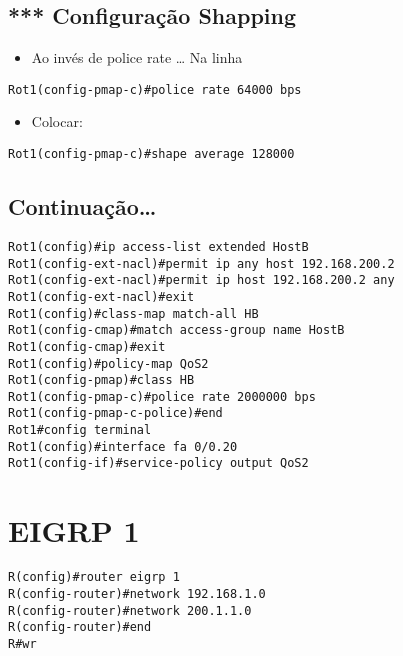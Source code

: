 \documentclass[]{article}
\begin{document}
\subsection{*** Configuração
Shapping}\label{configurauxe7uxe3o-shapping}

\begin{itemize}
\itemsep1pt\parskip0pt
\item
  Ao invés de police rate \ldots{} Na linha
\end{itemize}

\begin{verbatim}
Rot1(config-pmap-c)#police rate 64000 bps
\end{verbatim}

\begin{itemize}
\itemsep1pt\parskip0pt
\item
  Colocar:
\end{itemize}

\begin{verbatim}
Rot1(config-pmap-c)#shape average 128000
\end{verbatim}

\subsection{Continuação\ldots{}}\label{continuauxe7uxe3o}

\begin{verbatim}
Rot1(config)#ip access-list extended HostB
Rot1(config-ext-nacl)#permit ip any host 192.168.200.2
Rot1(config-ext-nacl)#permit ip host 192.168.200.2 any
Rot1(config-ext-nacl)#exit
Rot1(config)#class-map match-all HB
Rot1(config-cmap)#match access-group name HostB
Rot1(config-cmap)#exit
Rot1(config)#policy-map QoS2
Rot1(config-pmap)#class HB
Rot1(config-pmap-c)#police rate 2000000 bps
Rot1(config-pmap-c-police)#end
Rot1#config terminal
Rot1(config)#interface fa 0/0.20
Rot1(config-if)#service-policy output QoS2
\end{verbatim}

\section{EIGRP 1}\label{eigrp-1}

\begin{verbatim}
R(config)#router eigrp 1
R(config-router)#network 192.168.1.0
R(config-router)#network 200.1.1.0
R(config-router)#end
R#wr
\end{verbatim}
\end{document}
